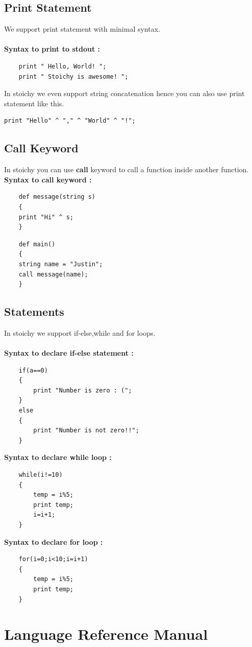 \documentclass[english,a4paper,12pt]{report}
\begin{document}
\section{Print Statement}
We support print statement with minimal syntax.
\\\\
\textbf{Syntax to print to stdout :}
\begin{verbatim}
    print " Hello, World! ";
    print " Stoichy is awesome! ";
\end{verbatim}
In stoichy we even support string concatenation hence you can also use print statement like this.
\begin{verbatim}
print "Hello" ^ "," ^ "World" ^ "!";
\end{verbatim}
\section{Call Keyword}
In stoichy you can use \textbf{call} keyword to call a function inside another function. \\
\textbf{Syntax to call keyword :}
\begin{verbatim}
    def message(string s)
    {
    print "Hi" ^ s;
    }
  \end{verbatim}
\begin{verbatim}
    def main()
    {
    string name = "Justin";
    call message(name);
    }
\end{verbatim}

\section{Statements}
In stoichy we support if-else,while and for loops.\\\\
\textbf{Syntax to declare if-else statement :}
\begin{verbatim}
    if(a==0)
    {
    	print "Number is zero : (";
    }
    else 
    {
    	print "Number is not zero!!";
    }
\end{verbatim}
\textbf{Syntax to declare while loop :}
\begin{verbatim}
    while(i!=10)
    {
        temp = i%5;
        print temp;
        i=i+1;
    }
\end{verbatim}
\textbf{Syntax to declare for loop :}
\begin{verbatim}
    for(i=0;i<10;i=i+1)
    {
        temp = i%5;
        print temp;
    }
\end{verbatim}
\chapter{Language Reference Manual}
\end{document}

